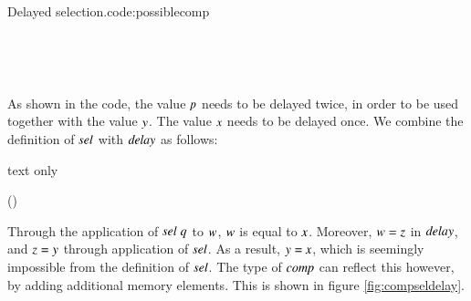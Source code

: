 \begin{texexptitled}{Delayed selection.}{code:possiblecomp}\begin{hscode}\SaveRestoreHook
{}%
%
%
\>[3]{}\mathbin{::}\langle{}\rangle\to {}\langle{}\mathbin{+}\rangle\to {}\langle{}\mathbin{+}\rangle\to {}\langle{}\mathbin{+}\rangle{}\<[E]%
\\
\>[3]{}\;\;\;\mathrel{=}\;\;\;\;\;\<[E]%
\ColumnHook
\end{hscode}\resethooks
\begin{hscode}\SaveRestoreHook
{}%
%
%
\>[3]{}\mathbin{::}\langle{}\rangle\to {}\langle{}\mathbin{+}\rangle{}\<[E]%
\\
\>[3]{}\;\mathrel{=}\<[E]%
\ColumnHook
\end{hscode}\resethooks
\end{texexptitled}

As shown in the code, the value \ensuremath{\Varid{p}} needs to be delayed twice, in order to be used together with the value \ensuremath{\Varid{y}}.
The value \ensuremath{\Varid{x}} needs to be delayed once.
We combine the definition of \ensuremath{\Varid{sel}} with \ensuremath{\Varid{delay}} as follows:
\begin{changemargin}{1cm}{0cm}
\begin{expansionno}{text only}\begin{hscode}\SaveRestoreHook
{}%
%
%
\>[3]{}\;\;\mathrel{=}\;\;\;(\;){}\<[E]%
\ColumnHook
\end{hscode}\resethooks
\end{expansionno}
\end{changemargin}

Through the application of \ensuremath{\Varid{sel}\;\Varid{q}} to \ensuremath{\Varid{w}}, \ensuremath{\Varid{w}} is equal to \ensuremath{\Varid{x}}.
Moreover, \ensuremath{\Varid{w}\mathrel{=}\Varid{z}} in \ensuremath{\Varid{delay}}, and \ensuremath{\Varid{z}\mathrel{=}\Varid{y}} through application of \ensuremath{\Varid{sel}}.
As a result, \ensuremath{\Varid{y}\mathrel{=}\Varid{x}}, which is seemingly impossible from the definition of \ensuremath{\Varid{sel}}.
The type of \ensuremath{\Varid{comp}} can reflect this however, by adding additional memory elements.
This is shown in figure \ref{fig:compseldelay}.

